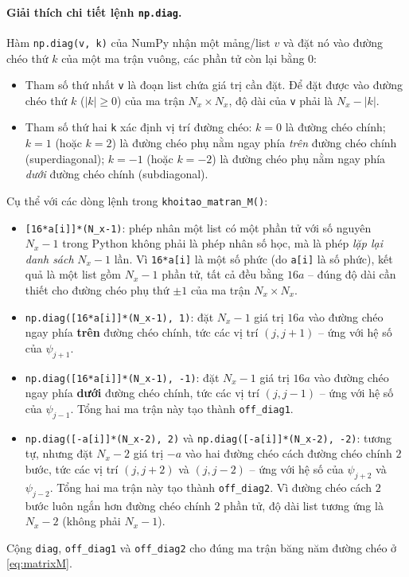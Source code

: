 \documentclass[12pt,a4paper]{article}
\begin{document}
\paragraph{Giải thích chi tiết lệnh \texttt{np.diag}.} Hàm \texttt{np.diag(v, k)} của NumPy nhận một mảng/list $v$ và đặt nó vào đường chéo thứ $k$ của một ma trận vuông, các phần tử còn lại bằng 0:
\begin{itemize}
    \item Tham số thứ nhất \texttt{v} là đoạn list chứa giá trị cần đặt. Để đặt được vào đường chéo thứ $k$ ($|k|\geq0$) của ma trận $N_x\times N_x$, độ dài của \texttt{v} phải là $N_x-|k|$.
    \item Tham số thứ hai \texttt{k} xác định vị trí đường chéo: $k=0$ là đường chéo chính; $k=1$ (hoặc $k=2$) là đường chéo phụ nằm ngay phía \emph{trên} đường chéo chính (superdiagonal); $k=-1$ (hoặc $k=-2$) là đường chéo phụ nằm ngay phía \emph{dưới} đường chéo chính (subdiagonal).
\end{itemize}
Cụ thể với các dòng lệnh trong \texttt{khoitao\_matran\_M()}:
\begin{itemize}
    \item \texttt{[16*a[i]]*(N\_x-1)}: phép nhân một list có một phần tử với số nguyên $N_x-1$ trong Python không phải là phép nhân số học, mà là phép \emph{lặp lại danh sách} $N_x-1$ lần. Vì \texttt{16*a[i]} là một số phức (do \texttt{a[i]} là số phức), kết quả là một list gồm $N_x-1$ phần tử, tất cả đều bằng $16a$ -- đúng độ dài cần thiết cho đường chéo phụ thứ $\pm1$ của ma trận $N_x\times N_x$.
    \item \texttt{np.diag([16*a[i]]*(N\_x-1), 1)}: đặt $N_x-1$ giá trị $16a$ vào đường chéo ngay phía \textbf{trên} đường chéo chính, tức các vị trí $(j,j+1)$ -- ứng với hệ số của $\psi_{j+1}$.
    \item \texttt{np.diag([16*a[i]]*(N\_x-1), -1)}: đặt $N_x-1$ giá trị $16a$ vào đường chéo ngay phía \textbf{dưới} đường chéo chính, tức các vị trí $(j,j-1)$ -- ứng với hệ số của $\psi_{j-1}$. Tổng hai ma trận này tạo thành \texttt{off\_diag1}.
    \item \texttt{np.diag([-a[i]]*(N\_x-2), 2)} và \texttt{np.diag([-a[i]]*(N\_x-2), -2)}: tương tự, nhưng đặt $N_x-2$ giá trị $-a$ vào hai đường chéo cách đường chéo chính $2$ bước, tức các vị trí $(j,j+2)$ và $(j,j-2)$ -- ứng với hệ số của $\psi_{j+2}$ và $\psi_{j-2}$. Tổng hai ma trận này tạo thành \texttt{off\_diag2}. Vì đường chéo cách $2$ bước luôn ngắn hơn đường chéo chính $2$ phần tử, độ dài list tương ứng là $N_x-2$ (không phải $N_x-1$).
\end{itemize}
Cộng \texttt{diag}, \texttt{off\_diag1} và \texttt{off\_diag2} cho đúng ma trận băng năm đường chéo ở \eqref{eq:matrixM}.
\end{document}
